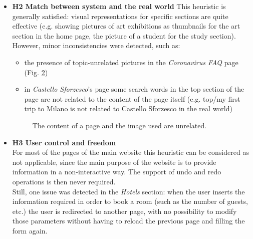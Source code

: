 \begin{itemize}
\begin{figure}[!ht]
\begin{minipage}{\linewidth}
                \label{H1-2}
            \end{minipage}
        \end{figure}
    \pagebreak
    \item \textbf{H2 Match between system and the real world}
        This heuristic is generally satisfied: visual representations for specific sections are quite effective (e.g. showing pictures of art exhibitions as thumbnails for the art section in the home page, the picture of a student for the study section). However, minor inconsistencies were detected, such as:
        \begin{itemize}
            \item the presence of topic-unrelated pictures in the \emph{Coronavirus FAQ} page (Fig. \ref{H2-1})
            \item in \emph{Castello Sforzesco}'s page some search words in the top section of the page are not related to the content of the page itself (e.g. top/my first trip to Milano is not related to Castello Sforzesco in the real world)
        \end{itemize}
        \begin{figure}[!ht]
            \begin{minipage}{\linewidth}
                \centering
                \captionsetup{justification=centering}
                \caption{The content of a page and the image used are unrelated.}
                \label{H2-1}
            \end{minipage}
        \end{figure}
    \item \textbf{H3 User control and freedom}\\
        For most of the pages of the main website this heuristic can be considered as not applicable, since the main purpose of the website is to provide information in a non-interactive way. The support of undo and redo operations is then never required.\\
        Still, one issue was detected in the \emph{Hotels} section: when the user inserts the information required in order to book a room (such as the number of guests, etc.) the user is redirected to another page, with no possibility to modify those parameters without having to reload the previous page and filling the form again.

\end{itemize}
